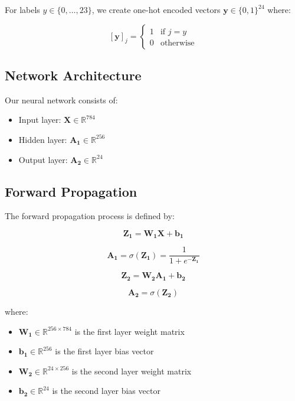 \documentclass[times,final,english]{revdetua}
\begin{document}
For labels $y \in \{0,\ldots,23\}$, we create one-hot encoded vectors $\mathbf{y} \in \{0,1\}^{24}$ where:

$$[\mathbf{y}]_j = \begin{cases}
1 & \text{if } j = y \\
0 & \text{otherwise}
\end{cases}$$

\subsection{Network Architecture}
Our neural network consists of:
\begin{itemize}
    \item Input layer: $\mathbf{X} \in \mathbb{R}^{784}$
    \item Hidden layer: $\mathbf{A_1} \in \mathbb{R}^{256}$
    \item Output layer: $\mathbf{A_2} \in \mathbb{R}^{24}$
\end{itemize}

\subsection{Forward Propagation}
The forward propagation process is defined by:

\begin{equation}
\mathbf{Z_1} = \mathbf{W_1}\mathbf{X} + \mathbf{b_1}
\end{equation}

\begin{equation}
\mathbf{A_1} = \sigma(\mathbf{Z_1}) = \frac{1}{1 + e^{-\mathbf{Z_1}}}
\end{equation}

\begin{equation}
\mathbf{Z_2} = \mathbf{W_2}\mathbf{A_1} + \mathbf{b_2}
\end{equation}

\begin{equation}
\mathbf{A_2} = \sigma(\mathbf{Z_2})
\end{equation}

where:
\begin{itemize}
    \item $\mathbf{W_1} \in \mathbb{R}^{256 \times 784}$ is the first layer weight matrix
    \item $\mathbf{b_1} \in \mathbb{R}^{256}$ is the first layer bias vector
    \item $\mathbf{W_2} \in \mathbb{R}^{24 \times 256}$ is the second layer weight matrix
    \item $\mathbf{b_2} \in \mathbb{R}^{24}$ is the second layer bias vector
\end{itemize}
\end{document}

